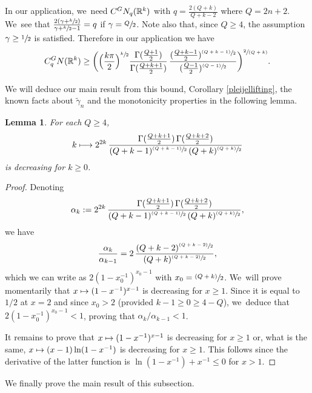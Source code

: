\documentclass[11pt]{article}
\newcommand\mto{\mathchoice{\longmapsto}{\mapsto}{\mapsto}{\mapsto}}
\let\oldsfrac\sfrac
\renewcommand{\sfrac}[2]{{\oldsfrac{#1}{#2}}}
\newcommand{\psfrac}[2]{{\sfrac{(#1)}{#2}}}
\newcommand{\spfrac}[2]{{\sfrac{#1}{(#2)}}}
\newcommand{\GN}{\textup{GN}}
\newtheorem{lemma}[theorem]{Lemma}
\theoremstyle{definition}
\newcommand{\1}{\mathbbm{1}}
\newcommand{\R}{\mathbb{R}}
\numberwithin{equation}{section}
\begin{document}
In our application, we~need $C^\GN_q(\R^k)$ with $q=\frac{2(Q+k)}{Q+k-2}$ where $Q=2n+2$. We~see that $\frac{2(\gamma+\sfrac k2)}{\gamma+\sfrac k2 -1} = q$ if $\gamma=\sfrac Q2$. Note also that, since $Q\geq 4$, the assumption $\gamma\geq\sfrac12$ is satisfied. Therefore in our application we have
\begin{equation}
\label{eq:cgnlower}
C_q^\GN(\R^k) \geq \biggl(\Bigl(\frac{k\pi}{2}\Bigr)^{\sfrac k2} \frac{\Gamma(\frac{Q+1}2)}{\Gamma(\frac{Q+k+1}2)} \,\frac{(\frac{Q+k-1}{2})^{\psfrac{Q+k-1}2}}{(\frac{Q-1}2)^{\psfrac{Q-1}2}}\biggr)^{\spfrac{2}{Q+k}}.
\end{equation}

We will deduce our main result from this bound, Corollary \ref{pleijellifting}, the known facts about $\tilde\gamma_n$ and the monotonicity properties in the following lemma.

\begin{lemma}\label{mono}
For each $Q\geq 4$,
\[
k \mto 2^{2k} \,\frac{\Gamma(\frac{Q+k+1}2)\,\Gamma(\frac{Q+k+2}2)}{(Q+k-1)^{\psfrac{Q+k-1}2} \,(Q+k)^\psfrac{Q+k}2}
\]
is decreasing for $k\geq 0$.
\end{lemma}

\begin{proof}
Denoting
\[
\alpha_k := 2^{2k} \,\frac{\Gamma(\frac{Q+k+1}2)\,\Gamma(\frac{Q+k+2}2)}{(Q+k-1)^{\psfrac{Q+k-1}2} \,(Q+k)^\psfrac{Q+k}2},
\]
we have
\[
\frac{\alpha_k}{\alpha_{k-1}} = 2 \,\frac{(Q+k-2)^{\psfrac{Q+k-2}2}}{(Q+k)^\psfrac{Q+k-2}2},
\]
which we can write as $2(1- x_0^{-1})^{x_0-1}$ with $x_0=\psfrac{Q+k}{2}$. We~will prove momentarily that $x\mto(1-x^{-1})^{x-1}$ is decreasing for $x\geq 1$. Since it is equal to $1/2$ at $x=2$ and since $x_0> 2$ (provided $k-1\geq 0\geq 4-Q$), we~deduce that $2(1- x_0^{-1})^{x_0-1}< 1$, proving that $\alpha_k/\alpha_{k-1}< 1$.

It remains to prove that $x\mto(1-x^{-1})^{x-1}$ is decreasing for $x\geq 1$ or, what is the same, $x\mto (x-1)\ln(1-x^{-1})$ is decreasing for $x\geq 1$. This follows since the derivative of the latter function is $\ln(1-x^{-1}) + x^{-1}\leq 0$ for $x>1$.
\end{proof}

We finally prove the main result of this subsection.
\end{document}
